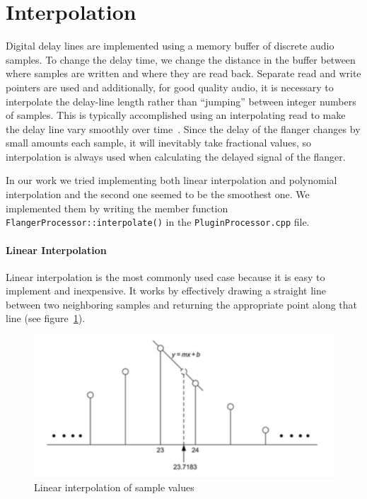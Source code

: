 \section{Interpolation}

Digital delay lines are implemented using a memory buffer of discrete audio samples. To change the delay time, we change the distance in the buffer between where samples are written and where they are read back.\cite{reiss2014audio}
Separate read and write pointers are used and additionally, for good quality audio, it is necessary to interpolate the delay-line length rather than ``jumping'' between integer numbers of samples. This is typically accomplished using an interpolating read to make the delay line vary smoothly over time~\cite{smith2010physical}.
Since the delay of the flanger changes by small amounts each sample, it will inevitably take fractional values, so interpolation is always used when calculating the delayed signal of the flanger.

In our work we tried implementing both linear interpolation and polynomial interpolation and the second one seemed to be the smoothest one.
We implemented them by writing the member function \texttt{FlangerProcessor::interpolate()} in the \texttt{PluginProcessor.cpp} file.

\paragraph{Linear Interpolation}
Linear interpolation is the most commonly used case because it is easy to implement and inexpensive.
It works by effectively drawing a straight line between two neighboring samples and returning the appropriate point along that line (see figure~\ref{fig:linear-interpolation}).
  
\begin{figure}[h]
	\centering
  	\includegraphics[width=0.8\linewidth]{assets/Linear interpolation of sample values.png}
  	\caption{Linear interpolation of sample values}
  	\label{fig:linear-interpolation}
\end{figure}

